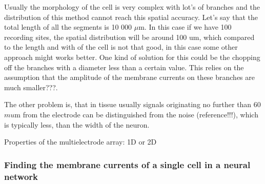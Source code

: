 \documentclass[12pt,a4paper]{article}
\begin{document}
Usually the morphology of the cell is very complex with lot's  of branches and the distribution of this method cannot reach this spatial accuracy. Let's say that the total length of all the segments is 10 000 $\mu$m. In this case if we have 100 recording sites, the spatial distribution will be around 100 um, which compared to the length and with of the cell is not that good, in this case some other approach might works better. One kind of solution for this could be the chopping off the branches with a diameter less than a certain value. This relies on the assumption that the amplitude of the membrane currents on these branches are much smaller???.


The other problem is, that in tissue usually signals originating no further than 60 $mu$m from the electrode can be distinguished from the noise (reference!!!), which is typically  less, than the width of the neuron.

Properties of the multielectrode array:
1D or 2D


 



\subsubsection{Finding the membrane currents of a single cell in a neural network}
\end{document}
